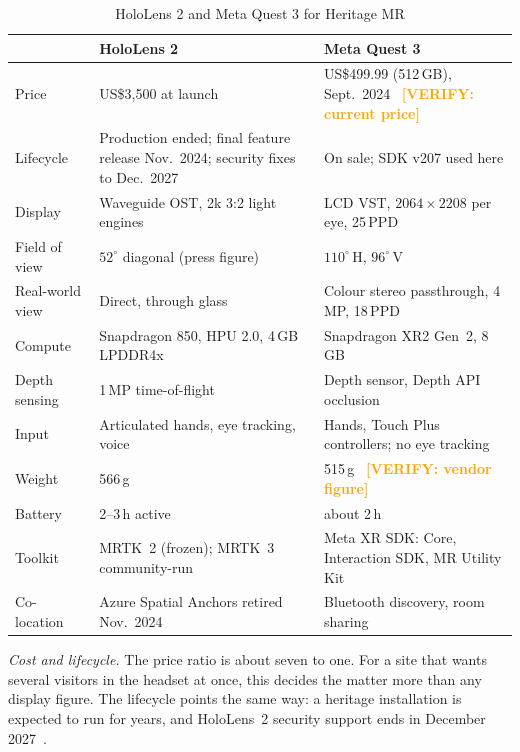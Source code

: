 \documentclass[conference]{IEEEtran}
\newcommand{\VERIFY}[1]{\textcolor{orange}{\textbf{[VERIFY#1]}}}
\begin{document}
\begin{table}[t]
\caption{HoloLens 2 and Meta Quest 3 for Heritage MR}
\label{tab:platform}
\centering\footnotesize
\setlength{\tabcolsep}{3pt}
\begin{tabular}{@{}p{1.45cm}p{3.15cm}p{3.15cm}@{}}
\toprule
 & \textbf{HoloLens 2} & \textbf{Meta Quest 3} \\
\midrule
Price & US\$3,500 at launch~\cite{hl2price} & US\$499.99 (512\,GB), Sept.\ 2024~\cite{q3price} \VERIFY{: current price} \\
Lifecycle & Production ended; final feature release Nov.\ 2024; security fixes to Dec.\ 2027~\cite{hl2eol,hl2discontinued} & On sale; SDK v207 used here \\
Display & Waveguide OST, 2k 3:2 light engines~\cite{hl2hardware} & LCD VST, $2064{\times}2208$ per eye, 25\,PPD~\cite{q3compare} \\
Field of view & $52^\circ$ diagonal (press figure)~\cite{hl2fov} & $110^\circ$\,H, $96^\circ$\,V~\cite{q3compare} \\
Real-world view & Direct, through glass & Colour stereo passthrough, 4\,MP, 18\,PPD~\cite{q3compare} \\
Compute & Snapdragon 850, HPU 2.0, 4\,GB LPDDR4x~\cite{hl2hardware} & Snapdragon XR2 Gen~2, 8\,GB~\cite{q3compare} \\
Depth sensing & 1\,MP time-of-flight~\cite{hl2hardware} & Depth sensor, Depth API occlusion~\cite{q3compare,metadepth} \\
Input & Articulated hands, eye tracking, voice~\cite{hl2hardware} & Hands, Touch Plus controllers; no eye tracking~\cite{q3compare} \\
Weight & 566\,g~\cite{hl2hardware} & 515\,g~\cite{q3vrcompare} \VERIFY{: vendor figure} \\
Battery & 2--3\,h active~\cite{hl2hardware} & about 2\,h~\cite{q3compare} \\
Toolkit & MRTK~2 (frozen); MRTK~3 community-run~\cite{mrtk2repo,mrtk3} & Meta XR SDK: Core, Interaction SDK, MR Utility Kit \\
Co-location & Azure Spatial Anchors retired Nov.\ 2024~\cite{asaretire} & Bluetooth discovery, room sharing~\cite{metacolocation,metaspacesharing} \\
\bottomrule
\end{tabular}
\end{table}

\textit{Cost and lifecycle.} The price ratio is about seven to one. For a site that wants several visitors in the headset at once, this decides the matter more than any display figure. The lifecycle points the same way: a heritage installation is expected to run for years, and HoloLens~2 security support ends in December 2027~\cite{hl2eol}.
\end{document}
